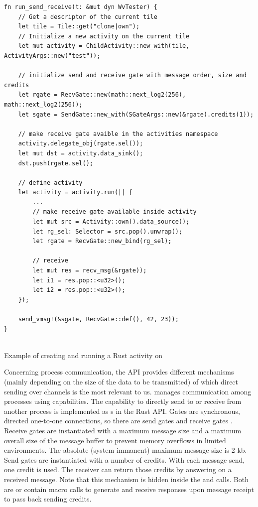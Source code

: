\begin{codefigure}
    \centering
    \begin{verbatim}
fn run_send_receive(t: &mut dyn WvTester) {
    // Get a descriptor of the current tile
    let tile = Tile::get("clone|own");
    // Initialize a new activity on the current tile
    let mut activity = ChildActivity::new_with(tile, ActivityArgs::new("test"));

    // initialize send and receive gate with message order, size and credits 
    let rgate = RecvGate::new(math::next_log2(256), math::next_log2(256));
    let sgate = SendGate::new_with(SGateArgs::new(&rgate).credits(1));

    // make receive gate avaible in the activities namespace
    activity.delegate_obj(rgate.sel());
    let mut dst = activity.data_sink();
    dst.push(rgate.sel();

    // define activity 
    let activity = activity.run(|| {
        ...
        // make receive gate available inside activity
        let mut src = Activity::own().data_source();
        let rg_sel: Selector = src.pop().unwrap();
        let rgate = RecvGate::new_bind(rg_sel);

        // receive 
        let mut res = recv_msg(&rgate));
        let i1 = res.pop::<u32>();
        let i2 = res.pop::<u32>();
    });

    send_vmsg!(&sgate, RecvGate::def(), 42, 23));
}
    
    \end{verbatim}
    \caption{Example of creating and running a Rust activity on \md}
    \label{fig:startingActivity}
\end{codefigure}

Concerning process communication, the API provides different mechanisms (mainly depending on the size of the data to be transmitted) of which direct sending over channels is the most relevant to us. \md manages communication among processes using capabilities. The capability to directly send to or receive from another process is implemented as s in the \md Rust API. Gates are synchronous, directed one-to-one connections, so there are send gates  and receive gates . Receive gates are instantiated with a maximum message size and a maximum overall size of the message buffer to prevent memory overflows in limited environments. The absolute (system immanent) maximum message size is 2 kb. Send gates are instantiated with a number of credits. With each message send, one credit is used. The receiver can return those credits by answering on a received message. Note that this mechanism is hidden inside the  and  calls. Both are or contain macro calls to generate and receive responses upon message receipt to pass back sending credits. \\

